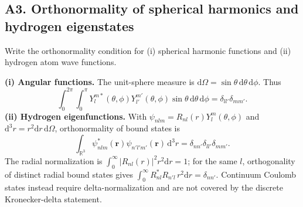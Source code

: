 \documentclass[11pt,a4paper]{article}
\newcommand{\dd}{\mathrm{d}}
\begin{document}
\subsection{A3. Orthonormality of spherical harmonics and hydrogen eigenstates}
\begin{questionbox}Write the orthonormality condition for (i) spherical harmonic functions and (ii) hydrogen atom wave functions.\end{questionbox}
\textbf{(i) Angular functions.} The unit-sphere measure is \(\dd\Omega=\sin\theta\,\dd\theta\,\dd\phi\). Thus
\begin{equation}\boxed{\int_0^{2\pi}\!\int_0^\pi Y_l^{m*}(\theta,\phi)Y_{l'}^{m'}(\theta,\phi)\sin\theta\,\dd\theta\,\dd\phi=\delta_{ll'}\delta_{mm'}.}\end{equation}
\textbf{(ii) Hydrogen eigenfunctions.} With \(\psi_{nlm}=R_{nl}(r)Y_l^m(\theta,\phi)\) and \(\dd^3r=r^2\dd r\,\dd\Omega\), orthonormality of bound states is
\begin{equation}\boxed{\int_{\mathbb R^3}\psi_{nlm}^*(\mathbf r)\psi_{n'l'm'}(\mathbf r)\,\dd^3r=\delta_{nn'}\delta_{ll'}\delta_{mm'}.}\end{equation}
The radial normalization is \(\int_0^\infty|R_{nl}(r)|^2r^2\dd r=1\); for the same \(l\), orthogonality of distinct radial bound states gives \(\int_0^\infty R_{nl}^*R_{n'l}\,r^2\dd r=\delta_{nn'}\). Continuum Coulomb states instead require delta-normalization and are not covered by the discrete Kronecker-delta statement.
\end{document}
